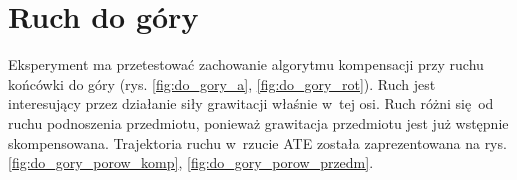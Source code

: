 

\section{Ruch do góry}

Eksperyment ma przetestować zachowanie algorytmu kompensacji przy ruchu końcówki do góry (rys. \ref{fig:do_gory_a}, \ref{fig:do_gory_rot}).  Ruch jest interesujący przez działanie siły grawitacji właśnie w~tej osi. Ruch różni się od ruchu podnoszenia przedmiotu, ponieważ grawitacja przedmiotu jest już wstępnie skompensowana. Trajektoria ruchu w~rzucie ATE została zaprezentowana na rys. \ref{fig:do_gory_porow_komp}, \ref{fig:do_gory_porow_przedm}.

